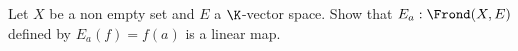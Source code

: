 Let $X$ be a non empty set and $E$ a $\K$-vector space. Show that $E_a : \Frond(X, E)$ defined by $E_a(f) = f(a)$ is a linear map.